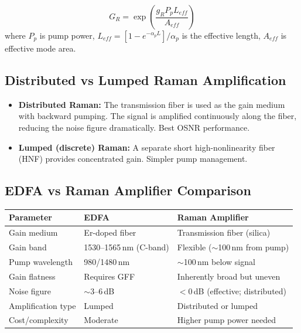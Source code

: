 \documentclass[12pt,a4paper]{article}
\renewcommand{\arraystretch}{1.45}
\begin{document}
\begin{tcolorbox}[formulabox, title={\textbf{Raman Gain}}]
\[
G_R = \exp\!\left(\frac{g_R P_p L_{eff}}{A_{eff}}\right)
\]
where $P_p$ is pump power, $L_{eff} = [1 - e^{-\alpha_p L}]/\alpha_p$ is the effective length, $A_{eff}$ is effective mode area.
\end{tcolorbox}

\subsection{Distributed vs Lumped Raman Amplification}
\begin{itemize}[leftmargin=*, itemsep=3pt]
  \item \textbf{Distributed Raman:} The transmission fiber is used as the gain medium with backward pumping. The signal is amplified continuously along the fiber, reducing the noise figure dramatically. Best OSNR performance.
  \item \textbf{Lumped (discrete) Raman:} A separate short high-nonlinearity fiber (HNF) provides concentrated gain. Simpler pump management.
\end{itemize}

\subsection{EDFA vs Raman Amplifier Comparison}
\par\noindent
{\renewcommand{\arraystretch}{1.55}
\begin{tabularx}{\linewidth}{|B{3.5cm}|Y|Y|}
\hline
\textbf{Parameter} & \textbf{EDFA} & \textbf{Raman Amplifier} \\
\hline
Gain medium & Er-doped fiber & Transmission fiber (silica) \\
\hline
Gain band & 1530--1565\,nm (C-band) & Flexible ($\sim$100\,nm from pump) \\
\hline
Pump wavelength & 980/1480\,nm & $\sim$100\,nm below signal \\
\hline
Gain flatness & Requires GFF & Inherently broad but uneven \\
\hline
Noise figure & $\sim$3--6\,dB & $<$0\,dB (effective; distributed) \\
\hline
Amplification type & Lumped & Distributed or lumped \\
\hline
Cost/complexity & Moderate & Higher pump power needed \\
\hline
\end{tabularx}}
\end{document}
